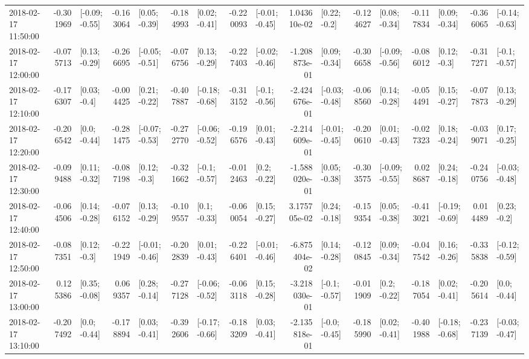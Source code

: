 \begin{tabular}{lrlrlrlrlrlrlrlrl}
2018-02-17 11:50:00 & -0.301969 &  [-0.09; -0.55] & -0.163064 &   [0.05; -0.39] & -0.184993 &   [0.02; -0.41] & -0.220093 &  [-0.01; -0.45] &  1.043610e-02 &    [0.22; -0.2] & -0.124627 &   [0.08; -0.34] & -0.117834 &   [0.09; -0.34] & -0.366065 &  [-0.14; -0.63] \\
2018-02-17 12:00:00 & -0.075713 &   [0.13; -0.29] & -0.266695 &  [-0.05; -0.51] & -0.076756 &   [0.13; -0.29] & -0.227403 &  [-0.02; -0.46] & -1.208873e-01 &   [0.09; -0.34] & -0.306658 &  [-0.09; -0.56] & -0.086012 &    [0.12; -0.3] & -0.317271 &   [-0.1; -0.57] \\
2018-02-17 12:10:00 & -0.176307 &    [0.03; -0.4] & -0.004425 &   [0.21; -0.22] & -0.407887 &  [-0.18; -0.68] & -0.313152 &   [-0.1; -0.56] & -2.424676e-01 &  [-0.03; -0.48] & -0.068560 &   [0.14; -0.28] & -0.054491 &   [0.15; -0.27] & -0.077873 &   [0.13; -0.29] \\
2018-02-17 12:20:00 & -0.206542 &    [0.0; -0.44] & -0.281475 &  [-0.07; -0.53] & -0.272770 &  [-0.06; -0.52] & -0.196576 &   [0.01; -0.43] & -2.214609e-01 &  [-0.01; -0.45] & -0.200610 &   [0.01; -0.43] & -0.027323 &   [0.18; -0.24] & -0.039071 &   [0.17; -0.25] \\
2018-02-17 12:30:00 & -0.099488 &   [0.11; -0.32] & -0.087198 &    [0.12; -0.3] & -0.321662 &   [-0.1; -0.57] & -0.012463 &    [0.2; -0.22] & -1.588020e-01 &   [0.05; -0.38] & -0.303575 &  [-0.09; -0.55] &  0.028687 &   [0.24; -0.18] & -0.240756 &  [-0.03; -0.48] \\
2018-02-17 12:40:00 & -0.064506 &   [0.14; -0.28] & -0.076152 &   [0.13; -0.29] & -0.109557 &    [0.1; -0.33] & -0.060054 &   [0.15; -0.27] &  3.175705e-02 &   [0.24; -0.18] & -0.159354 &   [0.05; -0.38] & -0.413021 &  [-0.19; -0.69] &  0.014489 &    [0.23; -0.2] \\
2018-02-17 12:50:00 & -0.087351 &    [0.12; -0.3] & -0.221949 &  [-0.01; -0.46] & -0.202839 &   [0.01; -0.43] & -0.226401 &  [-0.01; -0.46] & -6.875404e-02 &   [0.14; -0.28] & -0.120845 &   [0.09; -0.34] & -0.047542 &   [0.16; -0.26] & -0.335838 &  [-0.12; -0.59] \\
2018-02-17 13:00:00 &  0.125386 &   [0.35; -0.08] &  0.069357 &   [0.28; -0.14] & -0.277128 &  [-0.06; -0.52] & -0.063118 &   [0.15; -0.28] & -3.218030e-01 &   [-0.1; -0.57] & -0.011909 &    [0.2; -0.22] & -0.187054 &   [0.02; -0.41] & -0.205614 &    [0.0; -0.44] \\
2018-02-17 13:10:00 & -0.207492 &    [0.0; -0.44] & -0.178894 &   [0.03; -0.41] & -0.392606 &  [-0.17; -0.66] & -0.183209 &   [0.03; -0.41] & -2.135818e-01 &   [-0.0; -0.45] & -0.185990 &   [0.02; -0.41] & -0.401988 &  [-0.18; -0.68] & -0.237139 &  [-0.03; -0.47] \\

\end{tabular}
